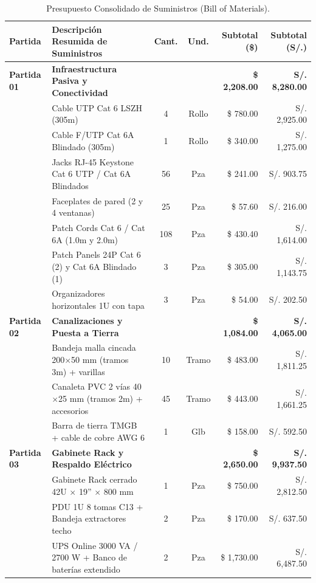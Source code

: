 \documentclass[11pt,a4paper]{article}
\begin{document}
\begin{table}[h!]
\centering
\small
\caption{Presupuesto Consolidado de Suministros (Bill of Materials).}
\label{tab:bom}
\begin{tabularx}{\textwidth}{l l c c r r}
\toprule
\textbf{Partida} & \textbf{Descripción Resumida de Suministros} & \textbf{Cant.} & \textbf{Und.} & \textbf{Subtotal (\$)} & \textbf{Subtotal (S/.)} \\
\midrule
\textbf{Partida 01} & \textbf{Infraestructura Pasiva y Conectividad} & & & \textbf{\$ 2,208.00} & \textbf{S/. 8,280.00} \\
& Cable UTP Cat 6 LSZH (305m) & 4 & Rollo & \$ 780.00 & S/. 2,925.00 \\
& Cable F/UTP Cat 6A Blindado (305m) & 1 & Rollo & \$ 340.00 & S/. 1,275.00 \\
& Jacks RJ-45 Keystone Cat 6 UTP / Cat 6A Blindados & 56 & Pza & \$ 241.00 & S/. 903.75 \\
& Faceplates de pared (2 y 4 ventanas) & 25 & Pza & \$ 57.60 & S/. 216.00 \\
& Patch Cords Cat 6 / Cat 6A (1.0m y 2.0m) & 108 & Pza & \$ 430.40 & S/. 1,614.00 \\
& Patch Panels 24P Cat 6 (2) y Cat 6A Blindado (1) & 3 & Pza & \$ 305.00 & S/. 1,143.75 \\
& Organizadores horizontales 1U con tapa & 3 & Pza & \$ 54.00 & S/. 202.50 \\
\midrule
\textbf{Partida 02} & \textbf{Canalizaciones y Puesta a Tierra} & & & \textbf{\$ 1,084.00} & \textbf{S/. 4,065.00} \\
& Bandeja malla cincada 200$\times$50 mm (tramos 3m) + varillas & 10 & Tramo & \$ 483.00 & S/. 1,811.25 \\
& Canaleta PVC 2 vías 40$\times$25 mm (tramos 2m) + accesorios & 45 & Tramo & \$ 443.00 & S/. 1,661.25 \\
& Barra de tierra TMGB + cable de cobre AWG 6 & 1 & Glb & \$ 158.00 & S/. 592.50 \\
\midrule
\textbf{Partida 03} & \textbf{Gabinete Rack y Respaldo Eléctrico} & & & \textbf{\$ 2,650.00} & \textbf{S/. 9,937.50} \\
& Gabinete Rack cerrado 42U $\times$ 19'' $\times$ 800 mm & 1 & Pza & \$ 750.00 & S/. 2,812.50 \\
& PDU 1U 8 tomas C13 + Bandeja extractores techo & 2 & Pza & \$ 170.00 & S/. 637.50 \\
& UPS Online 3000 VA / 2700 W + Banco de baterías extendido & 2 & Pza & \$ 1,730.00 & S/. 6,487.50 \\

\end{tabularx}
\end{table}
\end{document}
